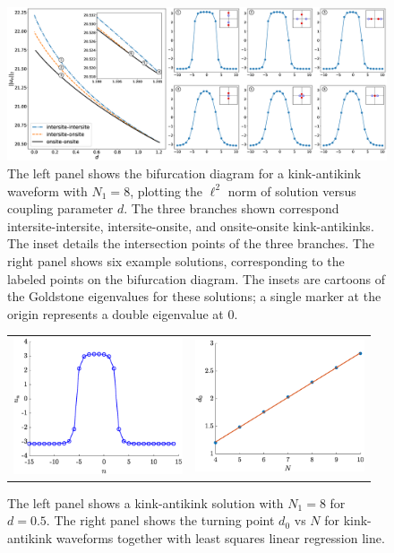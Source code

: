 \documentclass[12pt,reqno]{amsart}
\begin{document}
\begin{figure}
	\begin{center}
	\includegraphics[width=16.5cm]{SGbifdiag.eps}
	\end{center}
	\caption{The left panel shows the bifurcation diagram for a kink-antikink waveform
	with $N_1 = 8$, plotting the $\ell^2$ norm of solution versus coupling parameter $d$. The three branches shown correspond intersite-intersite, intersite-onsite, and onsite-onsite kink-antikinks. The inset details the intersection points of the three branches. The right panel shows six example solutions, corresponding to the labeled points on the bifurcation diagram. The insets are cartoons of the Goldstone eigenvalues for these solutions; a single marker at the origin represents a double eigenvalue at 0.}
	\label{fig:SGbifdiag}
\end{figure}

\begin{figure}
	\begin{center}
	\begin{tabular}{cc}
	\includegraphics[width=5cm]{2kink.eps} &
	\includegraphics[width=5cm]{kakd0vsN.eps}
	\end{tabular}
	\end{center}
	\caption{The left panel shows a kink-antikink solution with $N_1 = 8$ for $d = 0.5$. The right panel shows the turning point $d_0$ vs $N$ for kink-antikink waveforms together with least squares linear regression line.}
	\label{fig:kak}
\end{figure}
\end{document}
